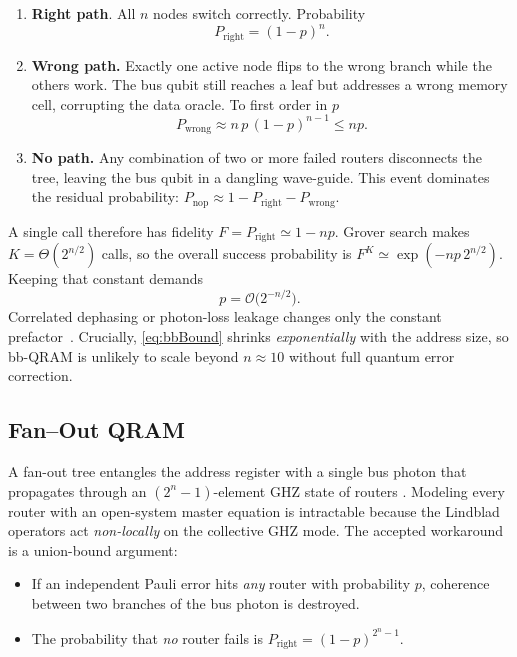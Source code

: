 \documentclass[11pt]{article}
\begin{document}
\begin{enumerate}
\item \textbf{Right path}.  
  All \(n\) nodes switch correctly.  
  Probability
  \[
     P_{\mathrm{right}}=(1-p)^{n}.
  \]

\item \textbf{Wrong path.}  
  Exactly one active node flips to the wrong
  branch while the others work.  
  The bus qubit still reaches a leaf but
  addresses a wrong memory cell, corrupting the data oracle.
  To first order in \(p\)
  \[
     P_{\mathrm{wrong}}\approx n\,p\,(1-p)^{n-1}\le np .
  \]

\item \textbf{No path.}  
  Any combination of two or more failed routers
  disconnects the tree, leaving the bus qubit in a dangling wave-guide.
  This event dominates the residual probability:
  \(P_{\mathrm{nop}}\approx 1-P_{\mathrm{right}}-P_{\mathrm{wrong}}\).
\end{enumerate}

A single call therefore has fidelity
\(F=P_{\mathrm{right}}\simeq 1-np\).
Grover search makes
\(K=\Theta(2^{n/2})\) calls, so the overall success probability is
\(F^{K}\simeq\exp(-np\,2^{n/2})\).
Keeping that constant demands
\begin{equation}
   p = \mathcal{O}\!\bigl(2^{-n/2}\bigr).
   \label{eq:bbBound}
\end{equation}
Correlated dephasing or photon-loss leakage changes only the constant
prefactor~\cite{Robust2024}.  
Crucially, \eqref{eq:bbBound} shrinks \emph{exponentially} with the
address size, so bb-QRAM is unlikely to scale beyond \(n\approx10\)
without full quantum error correction.



\subsection{Fan--Out QRAM}
\label{ssec:fanout}

A fan-out tree entangles the address register with a single bus photon
that propagates through an \((2^{n}-1)\)-element GHZ state of routers
\cite{Giovannetti2008}.  
Modeling every router with an open-system master equation is intractable
because the Lindblad operators act \emph{non-locally} on the collective
GHZ mode.
The accepted workaround is a union-bound argument:

\begin{itemize}
\item If an independent Pauli error hits \emph{any} router with
      probability \(p\), coherence between two branches of the bus
      photon is destroyed.
\item The probability that \emph{no} router fails is
      \(P_{\mathrm{right}}=(1-p)^{2^{n}-1}\).
\end{itemize}
\end{document}
